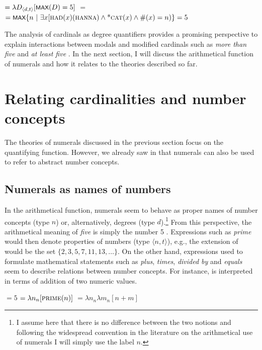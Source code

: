 \documentclass[output=paper]{langscibook}
\begin{document}
	\ea \ea {} $=\lambda D_{\langle d,t\rangle}[\cnst{max}(D)=5]$\label{ex:five-degree}
\ex {} $=$ $=\cnst{max}\{n\ |\ \exists x[\textsc{had}(x)(\textsc{hanna}) \wedge \text{*}\textsc{cat}(x) \wedge \#(x)=n)\}=5$\label{ex:five-cats-degree}
\z
\z
	
	\noindent The analysis of cardinals as degree quantifiers provides a promising perspective to explain interactions between modals and modified cardinals such as \textit{more than five} and \textit{at least five} \citep{nouwen2010two}. In the next section, I will discuss the arithmetical function of numerals and how it relates to the theories described so far.

\section{Relating cardinalities and number concepts}\label{sec:relating-cardinalities-and-number-concepts}

    The theories of numerals discussed in the previous section focus on the quantifying function. However, we already saw in  that numerals can also be used to refer to abstract number concepts.
 
	\subsection{Numerals as names of numbers}\label{sec:numerals-as-names-of-numbers}
	
	In the arithmetical function, numerals seem to behave as proper names of number concepts (type $n$) or, alternatively, degrees (type $d$).\footnote{I assume here that there is no difference between the two notions and following the widespread convention in the literature on the arithmetical use of numerals I will simply use the label $n$.} From this perspective, the arithmetical meaning of \textit{five} is simply the number 5 . Expressions such as \textit{prime} would then denote properties of numbers (type $\langle n,t\rangle$), e.g., the extension of  would be the set $\{2,3,5,7,11,13,\dots\}$. On the other hand, expressions used to formulate mathematical statements such as \textit{plus}, \textit{times}, \textit{divided by} and \textit{equals} seem to describe relations between number concepts. For instance,  is interpreted in terms of addition of two numeric values.
	
		\ea \ea {} $=5$\label{ex:five-number}
\ex {} $=\lambda n_n[\textsc{prime}(n)]$\label{ex:prime-number}
\ex {} $=\lambda n_n\lambda m_n[n+m]$\label{ex:plus-number}
\z
\z
\end{document}
